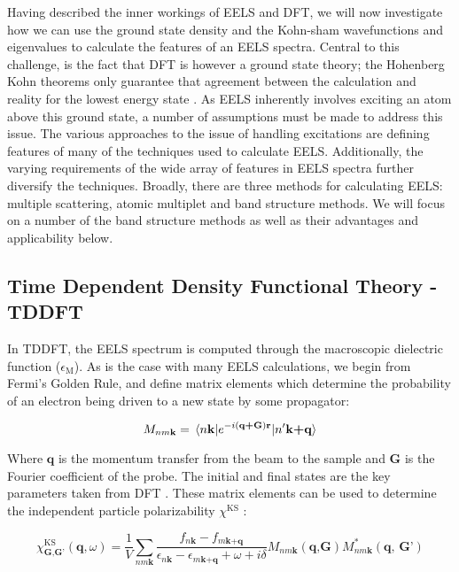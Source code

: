 
Having described the inner workings of EELS and DFT, we will now investigate how we can use the ground state density and the Kohn-sham wavefunctions and eigenvalues to calculate the features of an EELS spectra.  Central to this challenge, is the fact that DFT is however a ground state theory; the Hohenberg Kohn theorems only guarantee that agreement between the calculation and reality for the lowest energy state \cite{hohenberg_inhomogeneous_1964}. As EELS inherently involves exciting an atom above this ground state, a number of assumptions must be made to address this issue. The various approaches to the issue of handling excitations are defining features of many of the techniques used to calculate EELS.  Additionally, the varying requirements of the wide array of features in EELS spectra further diversify the techniques. Broadly, there are three methods for calculating EELS: multiple scattering, atomic multiplet and band structure methods.  We will focus on a number of the band structure methods as well as their advantages and applicability below.


\subsection{Time Dependent Density Functional Theory -TDDFT}
In TDDFT, the EELS spectrum is computed through the macroscopic dielectric function ($\epsilon_{\mathrm{M}}$). As is the case with many EELS calculations, we begin from Fermi's Golden Rule, and define matrix elements which determine the probability of an electron being driven to a new state by some propagator:

\begin{equation}
M_{nm\textbf{k}} = \mel{n\textbf{k}}{e^{-i(\textbf{q+G})\textbf{r}}}{n'\textbf{k+q}}
\label{FGR}
\end{equation}

Where $\textbf{q}$ is the momentum transfer from the beam to the sample and \textbf{G} is the Fourier coefficient of the probe. The initial and final states are the key parameters taken from DFT \cite{exciting}.  These matrix elements can be used to determine the independent particle polarizability $\chi^{\mathrm{KS}}$ \cite{exciting}: 


\begin{equation}
\chi^{\mathrm{KS}}_{\mathrm{\textbf{G,G'}}}(\textbf{q},\omega)=\frac{1}{V}\sum_{nm\textbf{k}}\frac{f_{n\textbf{k}}-f_{m\textbf{k+q}}}{\epsilon_{n\textbf{k}}-\epsilon_{m\textbf{k+q}}+\omega + i\delta} M_{nm\textbf{k}}(\textbf{q,G})M^*_{nm\textbf{k}}(\textbf{q, G'})
\end{equation}

